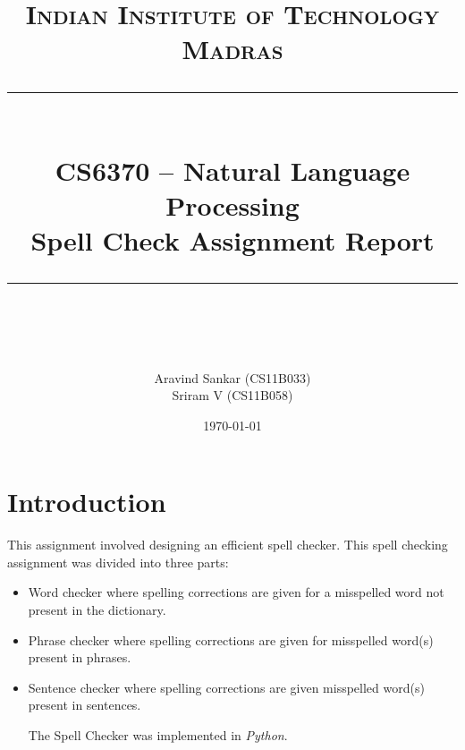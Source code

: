 \newcommand{\horrule}[1]{\rule{\linewidth}{#1}} %

\title{	
\normalfont \normalsize 
\textsc{Indian Institute of Technology Madras} \\ [25pt] %
\horrule{0.5pt} \\[0.4cm] %
\huge CS6370 -- Natural Language Processing \\ Spell Check Assignment Report \\ %
\horrule{2pt} \\[0.5cm] %
}
\author{\large Aravind Sankar (CS11B033) \\ \large Sriram V (CS11B058)} %

\date{\normalsize\today} %



\maketitle
\thispagestyle{empty}
\section{Introduction}
This assignment involved designing an efficient spell checker. This spell checking assignment was divided into three parts: 
\begin{itemize}
\item Word checker where spelling corrections are given for a misspelled word not present in the dictionary.
\item Phrase checker where spelling corrections are given for misspelled word(s) present in phrases.
\item Sentence checker where spelling corrections are given misspelled word(s) present in sentences.

The Spell Checker was implemented in \textit{Python}.
\end{itemize}

